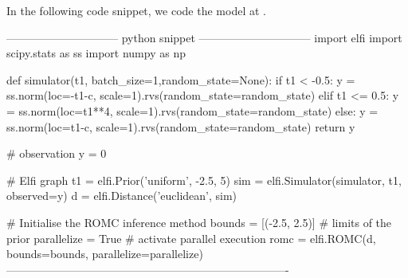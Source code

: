 
In the following code snippet, we code the model at .

\begin{Code}
------------------------------ python snippet ------------------------------
  import elfi import scipy.stats as ss
  import numpy as np

  def simulator(t1, batch_size=1,random_state=None):
    if t1 < -0.5:
        y = ss.norm(loc=-t1-c, scale=1).rvs(random_state=random_state)
    elif t1 <= 0.5:
        y = ss.norm(loc=t1**4, scale=1).rvs(random_state=random_state)
    else:
        y = ss.norm(loc=t1-c, scale=1).rvs(random_state=random_state)
    return y

  # observation
  y = 0
      
  # Elfi graph
  t1 = elfi.Prior('uniform', -2.5, 5)
  sim = elfi.Simulator(simulator, t1, observed=y)
  d = elfi.Distance('euclidean', sim)

  # Initialise the ROMC inference method
  bounds = [(-2.5, 2.5)] # limits of the prior
  parallelize = True # activate parallel execution
  romc = elfi.ROMC(d, bounds=bounds, parallelize=parallelize)
----------------------------------------------------------------------------    
\end{Code}
